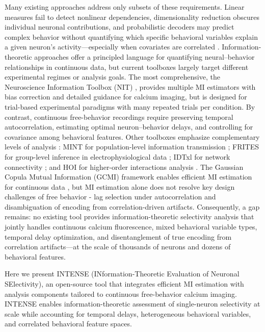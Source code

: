 Many existing approaches address only subsets of these requirements. Linear measures fail to detect nonlinear dependencies, dimensionality reduction obscures individual neuronal contributions, and probabilistic decoders may predict complex behavior without quantifying which specific behavioral variables explain a given neuron’s activity—especially when covariates are correlated  \cite{Kriegeskorte2019}.
Information-theoretic approaches offer a principled language for quantifying neural–behavior relationships in continuous data, but current toolboxes largely target different experimental regimes or analysis goals. The most comprehensive, the Neuroscience Information Toolbox (NIT) \cite{Maffulli2022}, provides multiple MI estimators with bias correction and detailed guidance for calcium imaging, but is designed for trial-based experimental paradigms with many repeated trials per condition. By contrast, continuous free-behavior recordings require preserving temporal autocorrelation, estimating optimal neuron–behavior delays, and controlling for covariance among behavioral features. Other toolboxes emphasize complementary levels of analysis : MINT for population-level information transmission \cite{MINT2025}; FRITES for group-level inference in electrophysiological data \cite{Frites2022}; IDTxl for network connectivity \cite{IDTxl2019}; and HOI for higher-order interactions analysis \cite{Neri2024}. The Gaussian Copula Mutual Information (GCMI) framework enables efficient MI estimation for continuous data \cite{gcmi}, but MI estimation alone does not resolve key design challenges of free behavior - lag selection under autocorrelation and disambiguation of encoding from correlation-driven artifacts. Consequently, a gap remains: no existing tool provides information-theoretic selectivity analysis that jointly handles continuous calcium fluorescence, mixed behavioral variable types, temporal delay optimization, and disentanglement of true encoding from correlation artifacts---at the scale of thousands of neurons and dozens of behavioral features.

Here we present INTENSE (INformation-Theoretic Evaluation of Neuronal SElectivity), an open-source tool that integrates efficient MI estimation with analysis components tailored to continuous free-behavior calcium imaging. INTENSE enables information-theoretic assessment of single-neuron selectivity at scale while accounting for temporal delays, heterogeneous behavioral variables, and correlated behavioral feature spaces. 

